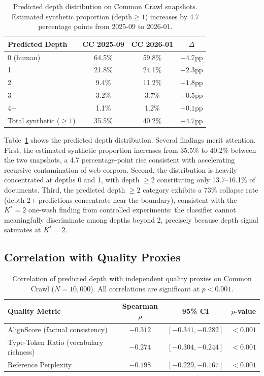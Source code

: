 \documentclass[11pt,a4paper]{article}
\begin{document}
\begin{table}[t]
\centering
\caption{Predicted depth distribution on Common Crawl snapshots. Estimated synthetic proportion ($\text{depth} \geq 1$) increases by 4.7 percentage points from 2025-09 to 2026-01.}
\label{tab:cc_depth}
\small
\begin{tabular}{lccc}
\toprule
\textbf{Predicted Depth} & \textbf{CC 2025-09} & \textbf{CC 2026-01} & \textbf{$\Delta$} \\
\midrule
0 (human) & 64.5\% & 59.8\% & $-4.7$pp \\
1 & 21.8\% & 24.1\% & $+2.3$pp \\
2 & 9.4\% & 11.2\% & $+1.8$pp \\
3 & 3.2\% & 3.7\% & $+0.5$pp \\
4+ & 1.1\% & 1.2\% & $+0.1$pp \\
\midrule
Total synthetic ($\geq 1$) & 35.5\% & 40.2\% & $+4.7$pp \\
\bottomrule
\end{tabular}
\end{table}

Table~\ref{tab:cc_depth} shows the predicted depth distribution. Several findings merit attention. First, the estimated synthetic proportion increases from 35.5\% to 40.2\% between the two snapshots, a 4.7 percentage-point rise consistent with accelerating recursive contamination of web corpora. Second, the distribution is heavily concentrated at depths 0 and 1, with depth $\geq 2$ constituting only 13.7--16.1\% of documents. Third, the predicted depth $\geq 2$ category exhibits a 73\% collapse rate (depth 2+ predictions concentrate near the boundary), consistent with the $K^*{=}2$ one-wash finding from controlled experiments: the classifier cannot meaningfully discriminate among depths beyond 2, precisely because depth signal saturates at $K^*{=}2$.

\subsection{Correlation with Quality Proxies}

\begin{table}[t]
\centering
\caption{Correlation of predicted depth with independent quality proxies on Common Crawl ($N = 10{,}000$). All correlations are significant at $p < 0.001$.}
\label{tab:cc_quality}
\small
\begin{tabular}{lccc}
\toprule
\textbf{Quality Metric} & \textbf{Spearman $\rho$} & \textbf{95\% CI} & \textbf{$p$-value} \\
\midrule
AlignScore (factual consistency) & $-0.312$ & $[-0.341, -0.282]$ & $< 0.001$ \\
Type-Token Ratio (vocabulary richness) & $-0.274$ & $[-0.304, -0.244]$ & $< 0.001$ \\
Reference Perplexity & $-0.198$ & $[-0.229, -0.167]$ & $< 0.001$ \\
\bottomrule
\end{tabular}
\end{table}
\end{document}
